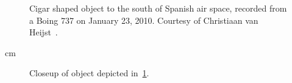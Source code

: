 \newpage
%
\begin{figure}[b]
\sidecaption
%
%
\caption{Cigar shaped object to the south of Spanish air space, recorded from a Boing 737 on January 23, 2010.
Courtesy of Christiaan van Heijst~\cite{vanHeijst2010Jan}.}

\label{2023-UFO-part-History-photos-2010-csssp-c}       %
\end{figure}

 cm

%
\begin{figure}[b]
\sidecaption
%
%
\caption{Closeup of object depicted in~\ref{2023-UFO-part-History-photos-2010-csssp-c}.}
\label{2023-UFO-part-History-photos-2010-csssp-cu}       %
\end{figure}
